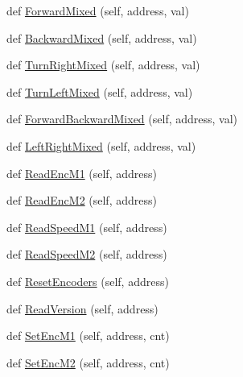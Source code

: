 \begin{DoxyCompactItemize}
\item 
def \mbox{\hyperlink{classtoxic__hardware_1_1roboclaw__3_1_1Roboclaw_acf82a90e2bcb68c83166a1be4978a556}{Forward\+Mixed}} (self, address, val)
\item 
def \mbox{\hyperlink{classtoxic__hardware_1_1roboclaw__3_1_1Roboclaw_a72ca8ef69781031cffede46595df8426}{Backward\+Mixed}} (self, address, val)
\item 
def \mbox{\hyperlink{classtoxic__hardware_1_1roboclaw__3_1_1Roboclaw_ad05d76efd4822a8f8ee8a558820083c8}{Turn\+Right\+Mixed}} (self, address, val)
\item 
def \mbox{\hyperlink{classtoxic__hardware_1_1roboclaw__3_1_1Roboclaw_aafa3ee25f590d5f4b0259f38b32bd626}{Turn\+Left\+Mixed}} (self, address, val)
\item 
def \mbox{\hyperlink{classtoxic__hardware_1_1roboclaw__3_1_1Roboclaw_a1895e1f56aaf7909852db2e576f59d2d}{Forward\+Backward\+Mixed}} (self, address, val)
\item 
def \mbox{\hyperlink{classtoxic__hardware_1_1roboclaw__3_1_1Roboclaw_ab1b403df0c19b03fa19fc6e6944b5bac}{Left\+Right\+Mixed}} (self, address, val)
\item 
def \mbox{\hyperlink{classtoxic__hardware_1_1roboclaw__3_1_1Roboclaw_a912ba280064ac04e9d69e7333da9c143}{Read\+Enc\+M1}} (self, address)
\item 
def \mbox{\hyperlink{classtoxic__hardware_1_1roboclaw__3_1_1Roboclaw_a070a811f611cd1b8c86c375eac24cd71}{Read\+Enc\+M2}} (self, address)
\item 
def \mbox{\hyperlink{classtoxic__hardware_1_1roboclaw__3_1_1Roboclaw_a4f1e923998c2561bbb86a04bc32df602}{Read\+Speed\+M1}} (self, address)
\item 
def \mbox{\hyperlink{classtoxic__hardware_1_1roboclaw__3_1_1Roboclaw_a9336d97afea54d955d7d241ac930bd18}{Read\+Speed\+M2}} (self, address)
\item 
def \mbox{\hyperlink{classtoxic__hardware_1_1roboclaw__3_1_1Roboclaw_ad6017e671abf27badfd65aa559a80681}{Reset\+Encoders}} (self, address)
\item 
def \mbox{\hyperlink{classtoxic__hardware_1_1roboclaw__3_1_1Roboclaw_ab0622e3f1cf0d537b1b4b73bde02fbe1}{Read\+Version}} (self, address)
\item 
def \mbox{\hyperlink{classtoxic__hardware_1_1roboclaw__3_1_1Roboclaw_a534607e041ee0ebe7cc66261071b537d}{Set\+Enc\+M1}} (self, address, cnt)
\item 
def \mbox{\hyperlink{classtoxic__hardware_1_1roboclaw__3_1_1Roboclaw_a8b54c048cc6b6aa19d4123f3d78dfb54}{Set\+Enc\+M2}} (self, address, cnt)

\end{DoxyCompactItemize}
